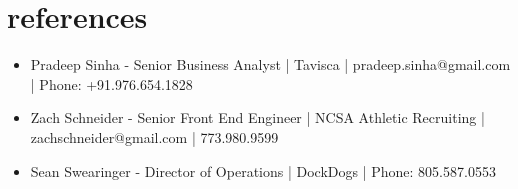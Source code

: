 \documentclass[legalpaper]{twentysecondcv} %
\begin{document}








\newpage %

\makeprofile %




\section{references}


   \begin{itemize}
   \item Pradeep Sinha - Senior Business Analyst | Tavisca | pradeep.sinha@gmail.com | Phone: +91.976.654.1828 
    \item Zach Schneider - Senior Front End Engineer | NCSA Athletic Recruiting | zachschneider@gmail.com | 773.980.9599
	\item Sean Swearinger - Director of Operations | DockDogs | Phone: 805.587.0553
\end{itemize}
\end{document}

